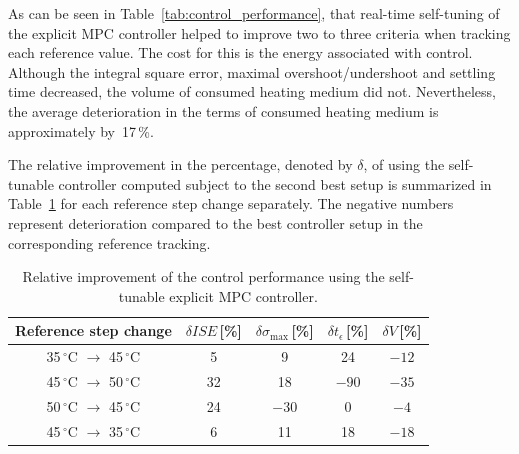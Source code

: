 \documentclass[preprint,12pt]{elsarticle}
\begin{document}
	As can be seen in Table~\ref{tab:control_performance}, that real-time self-tuning of the explicit MPC controller helped to improve two to three criteria when tracking each reference value. The cost for this is the energy associated with control. Although the integral square error, maximal overshoot/undershoot and settling time decreased, the volume of consumed heating medium did not. Nevertheless, the average deterioration in the terms of consumed heating medium is approximately by~17\,\%. 
	
	The relative improvement in the percentage, denoted by $\delta$, of using the self-tunable controller computed subject to the second best setup is summarized in Table~\ref{tab:improvement} for each reference step change separately. The negative numbers represent deterioration compared to the best controller setup in the corresponding reference tracking. 
	
	\begin{table}[h!]
		\begin{center}
			\caption{Relative improvement of the control performance using the self-tunable explicit MPC controller.}
			\label{tab:improvement}
			\begin{tabular}{c|c|c|c|c} 
				Reference step change & $\delta ISE$\,[\%] & $\delta \sigma_{\mathrm{max}}$\,[\%] & $\delta t_{\epsilon}$\,[\%] & $\delta V$\,[\%] \\
				\hline
				35\,$^{\circ}$C $\rightarrow$ 45\,$^{\circ}$C &  5 &  9 & 24 &$-12$ \\ 
				45\,$^{\circ}$C $\rightarrow$ 50\,$^{\circ}$C & 32 & 18 &$-90$ & $-35$ \\ 
				50\,$^{\circ}$C $\rightarrow$ 45\,$^{\circ}$C & 24 &$-30$& 0 &$-4$\\ 
				45\,$^{\circ}$C $\rightarrow$ 35\,$^{\circ}$C &  6 & 11 & 18 &$-18$  
			\end{tabular}
		\end{center}
	\end{table}
	
\end{document}

